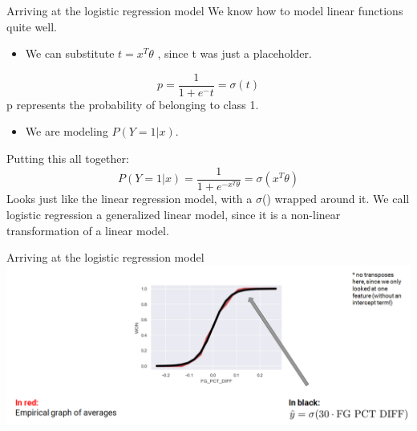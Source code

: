 \documentclass[aspectratio=169]{../latex_main/tntbeamer}  %
\begin{document}
	
	
	\begin{frame}{Arriving at the logistic regression model}
	    We know how to model linear functions quite well.\\
	    \begin{itemize}
	        \item We can substitute          $t = x^T\theta $           , since t was just a placeholder.
	    \end{itemize}
	    \begin{equation*}
	        p = \frac{1}{1 + e^-t} = \sigma (t)
	    \end{equation*}
	    p represents the probability of belonging to class 1.
	    \begin{itemize}
	        \item We are modeling          $P(Y=1|x)$.
	    \end{itemize}
	    Putting this all together:
	    \begin{equation*}
	        P(Y=1|x) = \frac{1}{1 + e^{-x^T\theta}} = \sigma(x^T\theta)
	    \end{equation*}
	    Looks just like the linear regression model, with a $\sigma$() wrapped around it.
We call logistic regression a generalized linear model, since it is a non-linear transformation of a linear model.

	\end{frame}
	
	
	
	\begin{frame}{Arriving at the logistic regression model}
	    \includegraphics[scale=.4]{Bild6}
	\end{frame}
\end{document}
